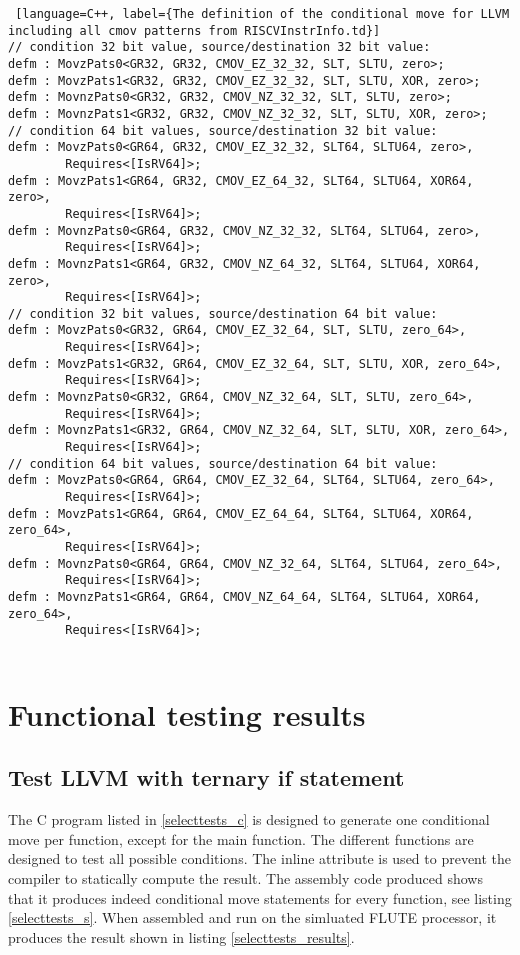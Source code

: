 \documentclass[12pt,twoside,notitlepage]{report}
\begin{document}
\begin{lstlisting} [language=C++, label={The definition of the conditional move for LLVM including all cmov patterns from RISCVInstrInfo.td}]
// condition 32 bit value, source/destination 32 bit value:
defm : MovzPats0<GR32, GR32, CMOV_EZ_32_32, SLT, SLTU, zero>;
defm : MovzPats1<GR32, GR32, CMOV_EZ_32_32, SLT, SLTU, XOR, zero>;
defm : MovnzPats0<GR32, GR32, CMOV_NZ_32_32, SLT, SLTU, zero>;           
defm : MovnzPats1<GR32, GR32, CMOV_NZ_32_32, SLT, SLTU, XOR, zero>;
// condition 64 bit values, source/destination 32 bit value:
defm : MovzPats0<GR64, GR32, CMOV_EZ_32_32, SLT64, SLTU64, zero>,
		Requires<[IsRV64]>;
defm : MovzPats1<GR64, GR32, CMOV_EZ_64_32, SLT64, SLTU64, XOR64, zero>,
		Requires<[IsRV64]>;
defm : MovnzPats0<GR64, GR32, CMOV_NZ_32_32, SLT64, SLTU64, zero>,
		Requires<[IsRV64]>;           
defm : MovnzPats1<GR64, GR32, CMOV_NZ_64_32, SLT64, SLTU64, XOR64, zero>,
		Requires<[IsRV64]>;
// condition 32 bit values, source/destination 64 bit value:
defm : MovzPats0<GR32, GR64, CMOV_EZ_32_64, SLT, SLTU, zero_64>,
		Requires<[IsRV64]>;
defm : MovzPats1<GR32, GR64, CMOV_EZ_32_64, SLT, SLTU, XOR, zero_64>,
		Requires<[IsRV64]>;
defm : MovnzPats0<GR32, GR64, CMOV_NZ_32_64, SLT, SLTU, zero_64>,
		Requires<[IsRV64]>;           
defm : MovnzPats1<GR32, GR64, CMOV_NZ_32_64, SLT, SLTU, XOR, zero_64>,
		Requires<[IsRV64]>;
// condition 64 bit values, source/destination 64 bit value:
defm : MovzPats0<GR64, GR64, CMOV_EZ_32_64, SLT64, SLTU64, zero_64>,
		Requires<[IsRV64]>;
defm : MovzPats1<GR64, GR64, CMOV_EZ_64_64, SLT64, SLTU64, XOR64, zero_64>,
		Requires<[IsRV64]>;
defm : MovnzPats0<GR64, GR64, CMOV_NZ_32_64, SLT64, SLTU64, zero_64>,
		Requires<[IsRV64]>;           
defm : MovnzPats1<GR64, GR64, CMOV_NZ_64_64, SLT64, SLTU64, XOR64, zero_64>,
		Requires<[IsRV64]>;
          
\end{lstlisting}

\chapter{Functional testing results}

\section{Test LLVM with ternary if statement}

The C program listed in \ref{selecttests_c} is designed to generate one conditional move per function, except for the main function. The different functions are designed to test all possible conditions. The inline attribute is used to prevent the compiler to statically compute the result. The assembly code produced shows that it produces indeed conditional move statements for every function, see listing \ref{selecttests_s}.
When assembled and run on the simluated FLUTE processor, it produces the result shown in listing \ref{selecttests_results}.
\end{document}
